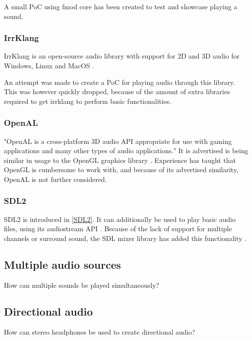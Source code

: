 \documentclass{article} %
\begin{document}
A small PoC using fmod core has been created to test and showcase playing a sound.

\subsubsection{IrrKlang}
IrrKlang is an open-source audio library with support for 2D and 3D audio for Windows, Linux and MacOS \cite{IrrKlang}.

An attempt was made to create a PoC for playing audio through this library. This was however quickly dropped, because of the amount of extra libraries required to get irrklang to perform basic functionalities.

\subsubsection{OpenAL}
"OpenAL is a cross-platform 3D audio API appropriate for use with gaming applications and many other types of audio applications." It is advertised is being similar in usage to the OpenGL graphics library \cite{OpenAL}.
Experience has taught that OpenGL is cumbersome to work with, and because of its advertised similarity, OpenAL is not further considered.

\subsubsection{SDL2}
SDL2 is introduced in \ref{SDL2}. It can additionally be used to play basic audio files, using its audiostream API \cite{SDLaudioStream}.
Because of the lack of support for multiple channels or surround sound, the SDL mixer library has added this functionality \cite{SDLmixer}.

\subsection{Multiple audio sources}
How can multiple sounds be played simultaneously?
\subsection{Directional audio}
How can stereo headphones be used to create directional audio?
\end{document}
